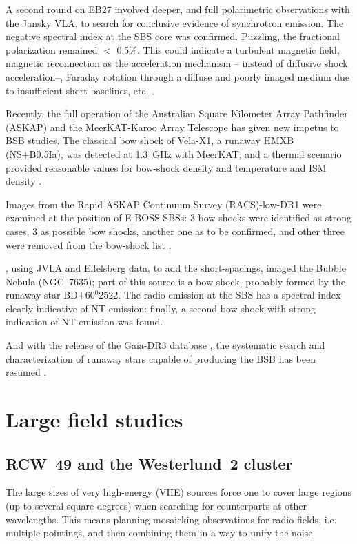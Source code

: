 \documentclass[baaa]{baaa}
\begin{document}
A second round on EB27 involved deeper, and full polarimetric observations with the Jansky VLA, to search for conclusive evidence of synchrotron emission. The negative spectral index at the SBS core was confirmed. %
Puzzling, the fractional polarization remained $<$ 0.5\%. This could indicate a turbulent magnetic field, magnetic reconnection as the acceleration mechanism -- instead of diffusive shock acceleration--, Faraday rotation through a diffuse and poorly imaged medium due to insufficient short baselines, etc. \citep{benagliabd2021}.


Recently, the full operation of the Australian Square Kilometer Array Pathfinder (ASKAP) and the MeerKAT-Karoo Array Telescope has given new impetus to BSB studies. The classical bow shock of Vela-X1, a runaway HMXB (NS+B0.5Ia), was detected at 1.3~GHz with MeerKAT, and a thermal scenario provided reasonable values for bow-shock density and temperature and ISM density \citep{vandenmeer2022}. 
  
Images from the Rapid ASKAP Continuum Survey (RACS)-low-DR1 were examined at the position of E-BOSS SBSs: 3 bow shocks were identified as strong cases, 3 as possible bow shocks, another one as to be confirmed, and other three were removed from the bow-shock list
\citep{vandenracs2022}.

\citet{moutzouri2022}, using JVLA and Effelsberg data, to add the short-spacings, imaged the Bubble Nebula (NGC~7635); part of this source is a bow shock, probably formed by the runaway star BD$+$60$^0$2522. The radio emission at the SBS has a spectral index clearly indicative of NT emission: finally, a second bow shock with strong indication of NT emission was found.

And with the release of the Gaia-DR3 database \citep{gaia3dr2023}, the systematic search and characterization of runaway stars capable of  producing the BSB has been resumed \citep{carretero2023}. 
 
\section{Large field studies}\label{sec:largestudies}

\subsection{RCW~49 and the Westerlund~2 cluster}
The large sizes of very high-energy (VHE) sources force one to cover large regions (up to several square degrees) when searching for counterparts  at other wavelengths. This means planning mosaicking observations for radio fields, i.e. multiple pointings, and then combining them in a way to unify the noise.
\end{document}
